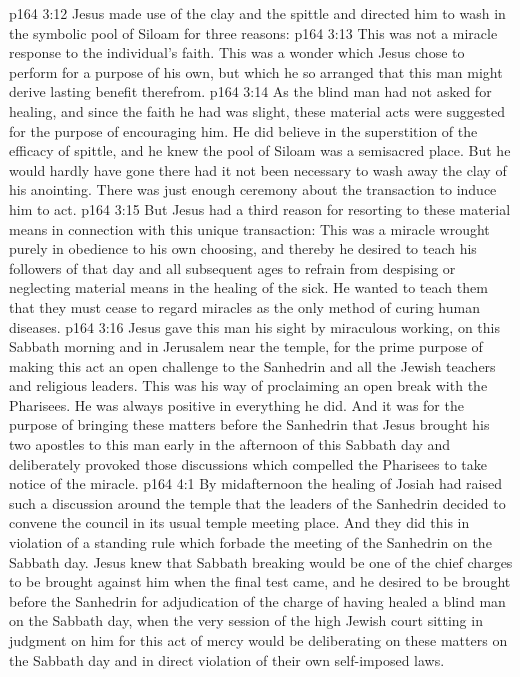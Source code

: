 \vs p164 3:12 Jesus made use of the clay and the spittle and directed him to wash in the symbolic pool of Siloam for three reasons:
\vs p164 3:13 \bibnobreakspace This was not a miracle response to the individual’s faith. This was a wonder which Jesus chose to perform for a purpose of his own, but which he so arranged that this man might derive lasting benefit therefrom.
\vs p164 3:14 \bibnobreakspace As the blind man had not asked for healing, and since the faith he had was slight, these material acts were suggested for the purpose of encouraging him. He did believe in the superstition of the efficacy of spittle, and he knew the pool of Siloam was a semisacred place. But he would hardly have gone there had it not been necessary to wash away the clay of his anointing. There was just enough ceremony about the transaction to induce him to act.
\vs p164 3:15 \bibnobreakspace But Jesus had a third reason for resorting to these material means in connection with this unique transaction: This was a miracle wrought purely in obedience to his own choosing, and thereby he desired to teach his followers of that day and all subsequent ages to refrain from despising or neglecting material means in the healing of the sick. He wanted to teach them that they must cease to regard miracles as the only method of curing human diseases.
\vs p164 3:16 \pc Jesus gave this man his sight by miraculous working, on this Sabbath morning and in Jerusalem near the temple, for the prime purpose of making this act an open challenge to the Sanhedrin and all the Jewish teachers and religious leaders. This was his way of proclaiming an open break with the Pharisees. He was always positive in everything he did. And it was for the purpose of bringing these matters before the Sanhedrin that Jesus brought his two apostles to this man early in the afternoon of this Sabbath day and deliberately provoked those discussions which compelled the Pharisees to take notice of the miracle.
\vs p164 4:1 By midafternoon the healing of Josiah had raised such a discussion around the temple that the leaders of the Sanhedrin decided to convene the council in its usual temple meeting place. And they did this in violation of a standing rule which forbade the meeting of the Sanhedrin on the Sabbath day. Jesus knew that Sabbath breaking would be one of the chief charges to be brought against him when the final test came, and he desired to be brought before the Sanhedrin for adjudication of the charge of having healed a blind man on the Sabbath day, when the very session of the high Jewish court sitting in judgment on him for this act of mercy would be deliberating on these matters on the Sabbath day and in direct violation of their own self\hyp{}imposed laws.
